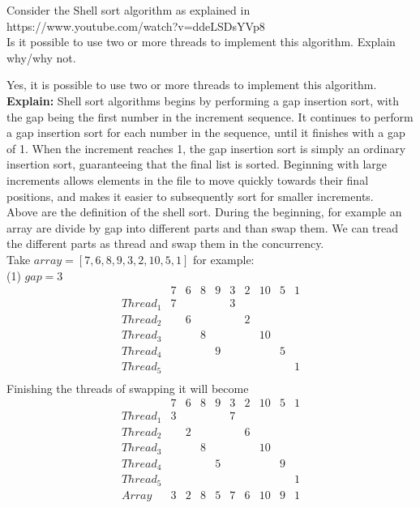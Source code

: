 \documentclass[12pt]{article}
\newenvironment{sol}[1][Solution]{\begin{trivlist}\item[\hskip\labelsep {\bfseries #1:}]}{\end{trivlist}}
\begin{document}
\begin{enumerate}
\newpage
\item Consider the Shell sort algorithm as explained in \\
https://www.youtube.com/watch?v=ddeLSDsYVp8 \\
Is it possible to use two or more threads to implement this algorithm. Explain why/why not.
\begin{sol}
Yes, it is possible to use two or more threads to implement this algorithm.
\textbf{Explain:} Shell sort algorithms begins by performing a gap insertion sort, with the gap being the first number in the increment sequence. It continues to perform a gap insertion sort for each number in the sequence, until it finishes with a gap of 1. When the increment reaches 1, the gap insertion sort is simply an ordinary insertion sort, guaranteeing that the final list is sorted. Beginning with large increments allows elements in the file to move quickly towards their final positions, and makes it easier to subsequently sort for smaller increments. \\
Above are the definition of the shell sort. During the beginning, for example an array are divide by gap into different parts and than swap them. We can tread the different parts as thread and swap them in the concurrency. \\
Take $array = [7, 6, 8, 9, 3, 2, 10, 5, 1]$ for example:\\
(1) $gap = 3$ \\
    \begin{equation*}
    \begin{matrix}
    & 7 & 6 & 8 & 9 & 3 & 2 & 10 & 5 & 1\\
Thread_1& 7 &   &   &   & 3 &   &    &   &   \\
Thread_2& & 6 &   &   &   & 2 &    &   &   \\
Thread_3& &   & 8 &   &   &   & 10  &   &   \\
Thread_4& &   &   & 9 &   &   &    & 5  &   \\
Thread_5& &   &   &   &   &   &    &   &  1 \\
    \end{matrix}
    \end{equation*}
Finishing the threads of swapping it will become 
    \begin{equation*}
        \begin{matrix}
            

    & 7 & 6 & 8 & 9 & 3 & 2 & 10 & 5 & 1\\
Thread_1& 3 &   &   &   & 7 &   &    &   &   \\
Thread_2& & 2 &   &   &   & 6 &    &   &   \\
Thread_3& &   & 8 &   &   &   & 10  &   &   \\
Thread_4& &   &   & 5 &   &   &    & 9  &   \\
Thread_5& &   &   &   &   &   &    &   &  1 \\
Array & 3&2   & 8  & 5  & 7  & 6  & 10   &9   &  1 \\
        \end{matrix}
    \end{equation*}


\end{sol}
\end{enumerate}
\end{document}
